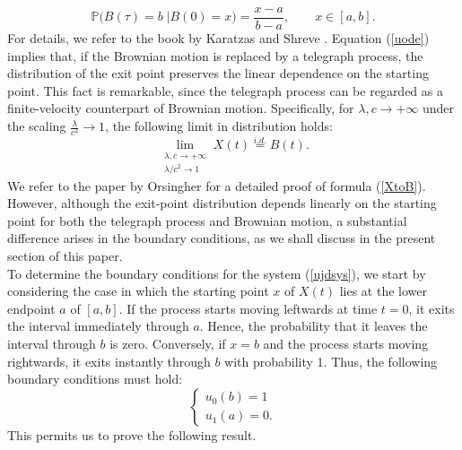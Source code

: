 \documentclass{article}
\begin{document}
\begin{equation}\mathbb{P}\Big(B(\tau)=b\;\Big\lvert B(0)=x\Big)=\frac{x-a}{b-a},\qquad x\in[a,b].\label{BMupr}\end{equation}
For details, we refer to the book by Karatzas and Shreve \cite{karatzas2014brownian}. Equation (\ref{uode}) implies that, if the Brownian motion is replaced by a telegraph process, the distribution of the exit point preserves the linear dependence on the starting point. This fact is remarkable, since the telegraph process can be regarded as a finite-velocity counterpart of Brownian motion. Specifically, for $\lambda,c\to+\infty$ under the scaling $\frac{\lambda}{c^2}\to1$, the following limit in distribution holds:
\begin{equation}\lim_{\substack{\lambda,c\to+\infty\\\lambda/c^2\to1}} X(t)\overset{i.d.}{=}B(t).\label{XtoB}\end{equation} We refer to the paper by Orsingher \cite{orsingher1990} for a detailed proof of formula (\ref{XtoB}). However, although the exit-point distribution depends linearly on the starting point for both the telegraph process and Brownian motion, a substantial difference arises in the boundary conditions, as we shall discuss in the present section of this paper.\\
To determine the boundary conditions for the system (\ref{ujdsys}), we start by considering the case in which the starting point $x$ of $X(t)$ lies at the lower endpoint $a$ of $[a,b]$. If the process starts moving leftwards at time $t=0$, it exits the interval immediately through $a$. Hence, the probability that it leaves the interval through $b$ is zero. Conversely, if $x=b$ and the process starts moving rightwards, it exits instantly through $b$ with probability 1. Thus, the following boundary conditions must hold:
\begin{equation}\label{bcep}\begin{cases}u_0(b)=1\\u_1(a)=0.\end{cases}\end{equation}
This permits us to prove the following result.
\end{document}
